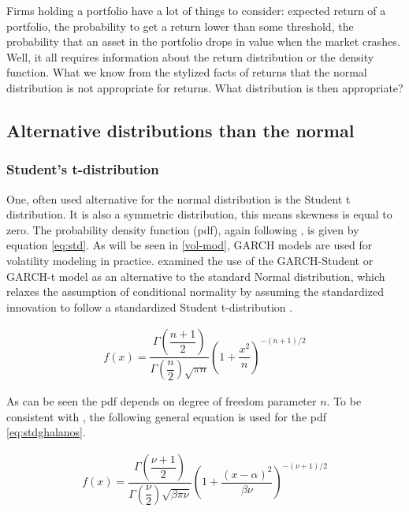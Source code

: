 \documentclass[a4paper, twoside]{templates/ociamthesis}
\begin{document}
Firms holding a portfolio have a lot of things to consider: expected return of a portfolio, the probability to get a return lower than some threshold, the probability that an asset in the portfolio drops in value when the market crashes. Well, it all requires information about the return distribution or the density function. What we know from the stylized facts of returns that the normal distribution is not appropriate for returns. What distribution is then appropriate?

\hypertarget{conditional-distributions}{%
\subsection{Alternative distributions than the normal}\label{conditional-distributions}}

\hypertarget{students-t-distribution}{%
\subsubsection{Student's t-distribution}\label{students-t-distribution}}

One, often used alternative for the normal distribution is the Student t distribution. It is also a symmetric distribution, this means skewness is equal to zero. The probability density function (pdf), again following \textcite{annaert2021}, is given by equation \eqref{eq:std}. As will be seen in \ref{vol-mod}, GARCH models are used for volatility modeling in practice. \textcite{bollerslev1987} examined the use of the GARCH-Student or GARCH-t model as an alternative to the standard Normal distribution, which relaxes the assumption of conditional normality by assuming the standardized innovation to follow a standardized Student t-distribution \autocite{bollerslev2008}.

\begin{align}
f(x) = \dfrac{\Gamma(\dfrac{n+1}{2})}{\Gamma(\dfrac{n}{2})\sqrt{\pi n}} (1+\dfrac{x^2}{n})^{-(n+1)/2}
 \label{eq:std}
\end{align}

As can be seen the pdf depends on degree of freedom parameter \(n\). To be consistent with \textcite{ghalanos2020}, the following general equation is used for the pdf \eqref{eq:stdghalanos}.

\begin{align}
f(x) = \dfrac{\Gamma(\dfrac{\nu+1}{2})}{\Gamma(\dfrac{\nu}{2})\sqrt{\beta \pi \nu}} \left(1+\dfrac{(x-\alpha)^2}{\beta \nu}\right)^{-(\nu+1)/2}
 \label{eq:stdghalanos}
\end{align}
\end{document}

